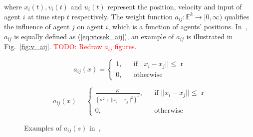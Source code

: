 \noindent
where $x_i(t), v_i(t)$ and $u_i(t)$ represent the position, velocity and input of agent $i$ at time step $t$ respectively. The weight function $a_{ij}:\mathbb{E}^k\to[0,\infty)$ qualifies the influence of agent $j$ on agent $i$, which is a function of agents' positions. In~\cite{Vicsek1995}, $a_{ij}$ is equally defined as (\ref{eq:vicsek_aij}), an example of $a_{ij}$ is illustrated in Fig.~\ref{fig:v_aij}. \textcolor{red}{TODO: Redraw $a_{ij}$ figures.}

\begin{equation}\label{eq:vicsek_aij}
a_{ij}(x)=\left\{\begin{array}{rcl}
1, & & \text{if $||x_i-x_j||\leq$ r}\\
0, & & \text{otherwise}
\end{array} \right.
\end{equation}

\begin{equation}\label{eq:cs_aij}
a_{ij}(x)=\left\{\begin{array}{rcl}
\frac{K}{(\sigma^2+||x_i-x_j||^2)^{\beta}}, & & \text{if $||x_i-x_j||\leq$ r}\\
0, & & \text{otherwise}
\end{array} \right.
\end{equation}

\begin{figure}[htb]
  \centering
  \caption{Examples of $a_{ij}(s)$ in~\cite{Vicsek1995},~\cite{CuckerSmale2007}}\label{fig:example_v}
\end{figure}

